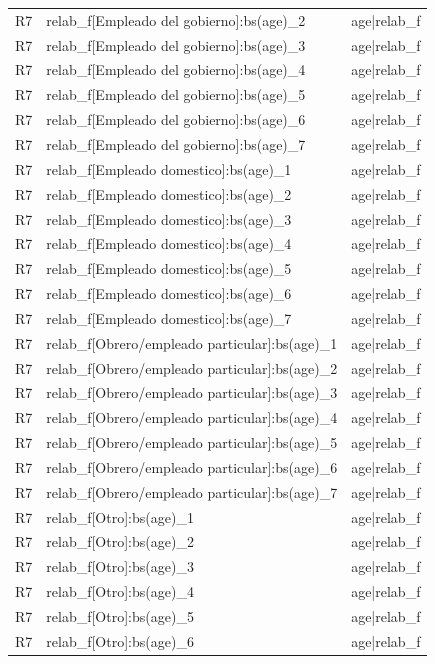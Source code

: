 \begin{longtable}{lll}
R7 & relab\_f[Empleado del gobierno]:bs(age)\_2 & age|relab\_f \\
R7 & relab\_f[Empleado del gobierno]:bs(age)\_3 & age|relab\_f \\
R7 & relab\_f[Empleado del gobierno]:bs(age)\_4 & age|relab\_f \\
R7 & relab\_f[Empleado del gobierno]:bs(age)\_5 & age|relab\_f \\
R7 & relab\_f[Empleado del gobierno]:bs(age)\_6 & age|relab\_f \\
R7 & relab\_f[Empleado del gobierno]:bs(age)\_7 & age|relab\_f \\
R7 & relab\_f[Empleado domestico]:bs(age)\_1 & age|relab\_f \\
R7 & relab\_f[Empleado domestico]:bs(age)\_2 & age|relab\_f \\
R7 & relab\_f[Empleado domestico]:bs(age)\_3 & age|relab\_f \\
R7 & relab\_f[Empleado domestico]:bs(age)\_4 & age|relab\_f \\
R7 & relab\_f[Empleado domestico]:bs(age)\_5 & age|relab\_f \\
R7 & relab\_f[Empleado domestico]:bs(age)\_6 & age|relab\_f \\
R7 & relab\_f[Empleado domestico]:bs(age)\_7 & age|relab\_f \\
R7 & relab\_f[Obrero/empleado particular]:bs(age)\_1 & age|relab\_f \\
R7 & relab\_f[Obrero/empleado particular]:bs(age)\_2 & age|relab\_f \\
R7 & relab\_f[Obrero/empleado particular]:bs(age)\_3 & age|relab\_f \\
R7 & relab\_f[Obrero/empleado particular]:bs(age)\_4 & age|relab\_f \\
R7 & relab\_f[Obrero/empleado particular]:bs(age)\_5 & age|relab\_f \\
R7 & relab\_f[Obrero/empleado particular]:bs(age)\_6 & age|relab\_f \\
R7 & relab\_f[Obrero/empleado particular]:bs(age)\_7 & age|relab\_f \\
R7 & relab\_f[Otro]:bs(age)\_1 & age|relab\_f \\
R7 & relab\_f[Otro]:bs(age)\_2 & age|relab\_f \\
R7 & relab\_f[Otro]:bs(age)\_3 & age|relab\_f \\
R7 & relab\_f[Otro]:bs(age)\_4 & age|relab\_f \\
R7 & relab\_f[Otro]:bs(age)\_5 & age|relab\_f \\
R7 & relab\_f[Otro]:bs(age)\_6 & age|relab\_f \\

\end{longtable}
